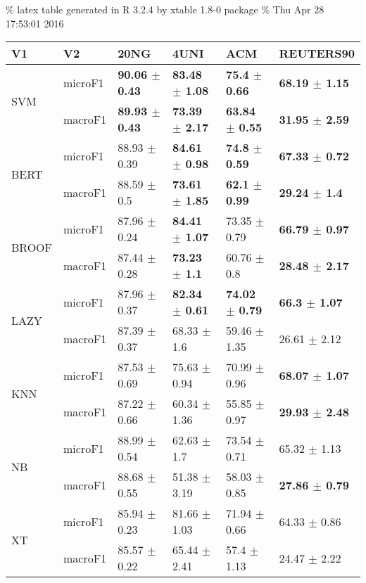 \documentclass[]{book}
\begin{document}
\% latex table generated in R 3.2.4 by xtable 1.8-0 package \% Thu Apr
28 17:53:01 2016

\begin{table}[ht]
\centering
\begin{tabular}{llllll}
  \hline
V1 & V2 & 20NG & 4UNI & ACM & REUTERS90 \\ 
  \cline{3-6} \hline
\multirow{2}{*}{SVM} & microF1 & \bf{90.06 $\pm$  0.43} & \bf{83.48 $\pm$  1.08} & \bf{75.4 $\pm$  0.66} & \bf{68.19 $\pm$  1.15} \\ 
   & macroF1 & \bf{89.93 $\pm$  0.43} & \bf{73.39 $\pm$  2.17} & \bf{63.84 $\pm$  0.55} & \bf{31.95 $\pm$  2.59} \\ 
   \cline{3-6}\multirow{2}{*}{BERT} & microF1 & 88.93 $\pm$  0.39 & \bf{84.61 $\pm$  0.98} & \bf{74.8 $\pm$  0.59} & \bf{67.33 $\pm$  0.72} \\ 
   & macroF1 & 88.59 $\pm$  0.5 & \bf{73.61 $\pm$  1.85} & \bf{62.1 $\pm$  0.99} & \bf{29.24 $\pm$  1.4} \\ 
   \cline{3-6}\multirow{2}{*}{BROOF} & microF1 & 87.96 $\pm$  0.24 & \bf{84.41 $\pm$  1.07} & 73.35 $\pm$  0.79 & \bf{66.79 $\pm$  0.97} \\ 
   & macroF1 & 87.44 $\pm$  0.28 & \bf{73.23 $\pm$  1.1} & 60.76 $\pm$  0.8 & \bf{28.48 $\pm$  2.17} \\ 
   \cline{3-6}\multirow{2}{*}{LAZY} & microF1 & 87.96 $\pm$  0.37 & \bf{82.34 $\pm$  0.61} & \bf{74.02 $\pm$  0.79} & \bf{66.3 $\pm$  1.07} \\ 
   & macroF1 & 87.39 $\pm$  0.37 & 68.33 $\pm$  1.6 & 59.46 $\pm$  1.35 & 26.61 $\pm$  2.12 \\ 
   \cline{3-6}\multirow{2}{*}{KNN} & microF1 & 87.53 $\pm$  0.69 & 75.63 $\pm$  0.94 & 70.99 $\pm$  0.96 & \bf{68.07 $\pm$  1.07} \\ 
   & macroF1 & 87.22 $\pm$  0.66 & 60.34 $\pm$  1.36 & 55.85 $\pm$  0.97 & \bf{29.93 $\pm$  2.48} \\ 
   \cline{3-6}\multirow{2}{*}{NB} & microF1 & 88.99 $\pm$  0.54 & 62.63 $\pm$  1.7 & 73.54 $\pm$  0.71 & 65.32 $\pm$  1.13 \\ 
   & macroF1 & 88.68 $\pm$  0.55 & 51.38 $\pm$  3.19 & 58.03 $\pm$  0.85 & \bf{27.86 $\pm$  0.79} \\ 
   \cline{3-6}\multirow{2}{*}{XT} & microF1 & 85.94 $\pm$  0.23 & 81.66 $\pm$  1.03 & 71.94 $\pm$  0.66 & 64.33 $\pm$  0.86 \\ 
   & macroF1 & 85.57 $\pm$  0.22 & 65.44 $\pm$  2.41 & 57.4 $\pm$  1.13 & 24.47 $\pm$  2.22 \\ 

\end{tabular}
\end{table}
\end{document}
